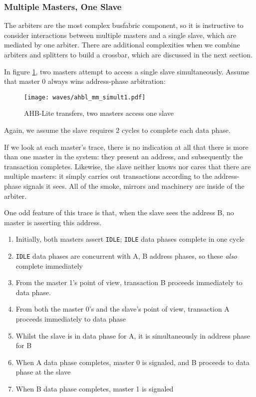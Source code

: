 \subsubsection{Multiple Masters, One Slave}

The arbiters are the most complex busfabric component, so it is instructive to consider interactions between multiple masters and a single slave, which are mediated by one arbiter. There are additional complexities when we combine arbiters and splitters to build a crossbar, which are discussed in the next section.

In figure \ref{diagram:ahbl_mm_simult1}, two masters attempt to access a single slave simultaneously. Assume that master 0 always wins address-phase arbitration:

\begin{figure}[H]
\centering
\caption{AHB-Lite transfers, two masters access one slave}
\texttt{[image: waves/ahbl\_mm\_simult1.pdf]}
\label{diagram:ahbl_mm_simult1}
\end{figure}

Again, we assume the slave requires 2 cycles to complete each data phase.

If we look at each master's trace, there is no indication at all that there is more than one master in the system: they present an address, and subsequently the transaction completes. Likewise, the slave neither knows nor cares that there are multiple masters: it simply carries out transactions according to the address-phase signals it sees. All of the smoke, mirrors and machinery are inside of the arbiter.

One odd feature of this trace is that, when the slave sees the address B, no master is asserting this address.

\begin{enumerate}
	\item Initially, both masters assert {\tt IDLE}; {\tt IDLE} data phases complete in one cycle
	\item {\tt IDLE} data phases are concurrent with A, B address phases, so these {\it also} complete immediately
	\item From the master 1's point of view, transaction B proceeds immediately to data phase.
	\item From both the master 0's and the slave's point of view, transaction A proceeds immediately to data phase
	\item Whilst the slave is in data phase for A, it is simultaneously in address phase for B
	\item When A data phase completes, master 0 is signaled, and B proceeds to data phase at the slave
	\item When B data phase completes, master 1 is signaled
\end{enumerate}

